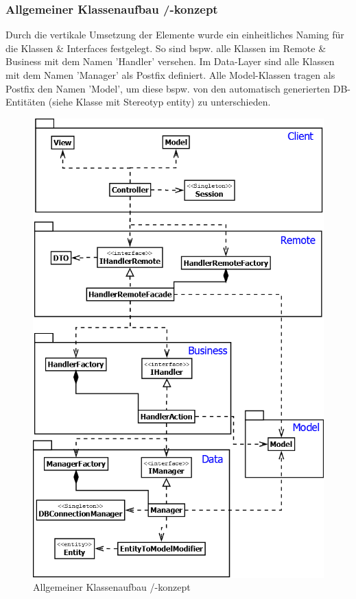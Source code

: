 \subsubsection{Allgemeiner Klassenaufbau /-konzept}
Durch die vertikale Umsetzung der Elemente wurde ein einheitliches Naming für die Klassen \& Interfaces festgelegt. So sind bspw. alle Klassen im Remote \& Business mit dem Namen 'Handler' versehen. Im Data-Layer sind alle Klassen mit dem Namen 'Manager' als Postfix definiert. Alle Model-Klassen tragen als Postfix den Namen 'Model', um diese bspw. von den automatisch generierten DB-Entitäten (siehe Klasse mit Stereotyp entity) zu unterschieden.
\begin{figure}[H]
	\centering
	\includegraphics[width=0.65\linewidth]{Images/Class-Generic}
	\caption{Allgemeiner Klassenaufbau /-konzept}
	\label{fig:class-generic}
\end{figure}

